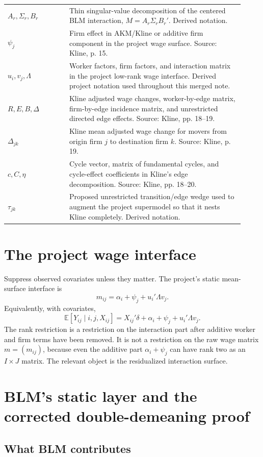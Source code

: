\documentclass[11pt]{article}
\newcommand{\E}{\mathbb{E}}
\begin{document}
\begin{longtable}{>{\raggedright\arraybackslash}p{0.24\linewidth}
                  >{\raggedright\arraybackslash}p{0.68\linewidth}}
\(A_r,\Sigma_r,B_r\) & Thin singular-value decomposition of the centered BLM interaction, \(M=A_r\Sigma_rB_r'\). Derived notation. \\
\(\psi_j\) & Firm effect in AKM/Kline or additive firm component in the project wage surface. Source: Kline, p. 15. \\
\(u_i,v_j,\Lambda\) & Worker factors, firm factors, and interaction matrix in the project low-rank wage interface. Derived project notation used throughout this merged note. \\
\(R,E,B,\Delta\) & Kline adjusted wage changes, worker-by-edge matrix, firm-by-edge incidence matrix, and unrestricted directed edge effects. Source: Kline, pp. 18--19. \\
\(\Delta_{jk}\) & Kline mean adjusted wage change for movers from origin firm \(j\) to destination firm \(k\). Source: Kline, p. 19. \\
\(c,C,\eta\) & Cycle vector, matrix of fundamental cycles, and cycle-effect coefficients in Kline's edge decomposition. Source: Kline, pp. 18--20. \\
\(\tau_{jk}\) & Proposed unrestricted transition/edge wedge used to augment the project supermodel so that it nests Kline completely. Derived notation. \\
\bottomrule
\end{longtable}

\section{The project wage interface}

Suppress observed covariates unless they matter. The project's static
mean-surface interface is
\[
m_{ij}
=
\alpha_i+\psi_j+u_i'\Lambda v_j.
\tag{LR-level}
\]
Equivalently, with covariates,
\[
\E[Y_{ij}\mid i,j,X_{ij}]
=
X_{ij}'\delta+\alpha_i+\psi_j+u_i'\Lambda v_j.
\]
The rank restriction is a restriction on the interaction part after additive
worker and firm terms have been removed. It is not a restriction on the raw
wage matrix \(m=(m_{ij})\), because even the additive part
\(\alpha_i+\psi_j\) can have rank two as an \(I\times J\) matrix. The relevant
object is the residualized interaction surface.

\section{BLM's static layer and the corrected double-demeaning proof}

\subsection{What BLM contributes}
\end{document}
